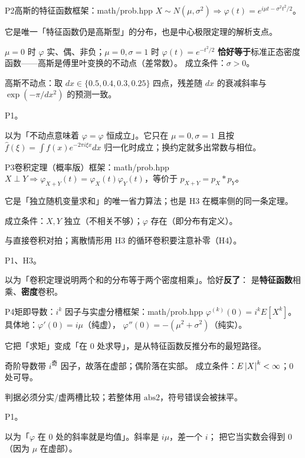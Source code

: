 \begin{know}{P2}{高斯的特征函数}{框架：math/prob.hpp}
 $X\sim N(\mu,\sigma^{2})\Rightarrow\varphi(t)=e^{i\mu t-\sigma^{2}t^{2}/2}$。

 它是唯一「特征函数仍是高斯型」的分布，也是中心极限定理的解析支点。

 $\mu=0$ 时 $\varphi$ 实、偶、非负；$\mu=0,\sigma=1$ 时
$\varphi(t)=e^{-t^{2}/2}$ \textbf{恰好等于}标准正态密度函数——高斯是傅里叶变换的不动点（差常数）。
成立条件：$\sigma>0$。

 高斯不动点：取 $dx\in\{0.5,0.4,0.3,0.25\}$ 四点，残差随 $dx$ 的衰减斜率与
$\exp(-\pi/dx^{2})$ 的预测一致。

 P1。

 以为「不动点意味着 $\varphi=\varphi$ 恒成立」。它只在 $\mu=0,\sigma=1$ 且按
$\hat f(\xi)=\int f(x)e^{-2\pi i\xi x}dx$ 归一化时成立；换约定就多出常数与相位。
\end{know}

\begin{know}{P3}{卷积定理（概率版）}{框架：math/prob.hpp}
 $X\perp Y\Rightarrow\varphi_{X+Y}(t)=\varphi_X(t)\varphi_Y(t)$，等价于
$p_{X+Y}=p_X*p_Y$。

 它是「独立随机变量求和」的唯一省力算法；也是 H3 在概率侧的同一条定理。

 成立条件：$X,Y$ 独立（不相关不够）；$\varphi$ 存在（即分布有定义）。

 与直接卷积对拍；离散情形用 H3 的循环卷积要注意补零（H4）。

 P1、H3。

 以为「卷积定理说明两个和的分布等于两个密度相乘」。恰好\textbf{反了}：
是\textbf{特征函数}相乘、\textbf{密度}卷积。
\end{know}

\begin{know}{P4}{矩即导数：$i^{k}$ 因子与实虚分槽}{框架：math/prob.hpp}
 $\varphi^{(k)}(0)=i^{k}E[X^{k}]$。具体地：$\varphi'(0)=i\mu$（纯虚），
$\varphi''(0)=-(\mu^{2}+\sigma^{2})$（纯实）。

 它把「求矩」变成「在 0 处求导」，是从特征函数反推分布的最短路径。

 奇阶导数带 $i^{\text{奇}}$ 因子，故落在虚部；偶阶落在实部。
成立条件：$E\left\lvert X\right\rvert^{k}<\infty$；$0$ 处可导。

 判据必须分实/虚两槽比较；若整体用 $\mathrm{abs2}$，符号错误会被抹平。

 P1。

 以为「$\varphi$ 在 0 处的斜率就是均值」。斜率是 $i\mu$，差一个 $i$；
把它当实数会得到 0（因为 $\mu$ 在虚部）。
\end{know}

